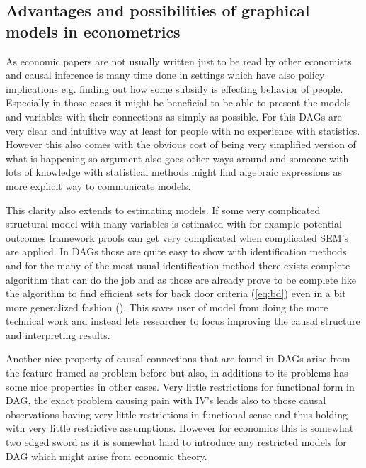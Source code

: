 \documentclass[main=english,12pt,a4paper,pdftex,econ,utf8]{aaltothesis}
\begin{document}
\subsection{Advantages and possibilities of graphical models in econometrics} \label{subsection:benefits}

As economic papers are not usually written just to be read by other economists and causal inference is many time done in settings which have also policy implications e.g. finding out how some subsidy is effecting behavior of people. Especially in those cases it might be beneficial to be able to present the models and variables with their connections as simply as possible. For this DAGs are very clear and intuitive way at least for people with no experience with statistics. However this also comes with the obvious cost of being very simplified version of what is happening so argument also goes other ways around and someone with lots of knowledge with statistical methods might find algebraic expressions as more explicit way to communicate models.

This clarity also extends to estimating models. If some very complicated structural model with many variables is estimated with for example potential outcomes framework proofs can get very complicated when complicated SEM's are applied. In DAGs those are quite easy to show with identification methods and for the many of the most usual identification method there exists complete algorithm that can do the job and as those are already prove to be complete like the algorithm to find efficient sets for back door criteria (\ref{eq:bd}) even in a bit more generalized fashion (\cite{Correa2017}). This saves user of model from doing the more technical work and instead lets researcher to focus improving the causal structure and interpreting results.

Another nice property of causal connections that are found in DAGs arise from the feature framed as problem before but also, in additions to its problems has some nice properties in other cases. Very little restrictions for functional form in DAG, the exact problem causing pain with IV's leads also to those causal observations having very little restrictions in functional sense and thus holding with very little restrictive assumptions. However for economics this is somewhat two edged sword as it is somewhat hard to introduce any restricted models for DAG which might arise from economic theory.
\end{document}

